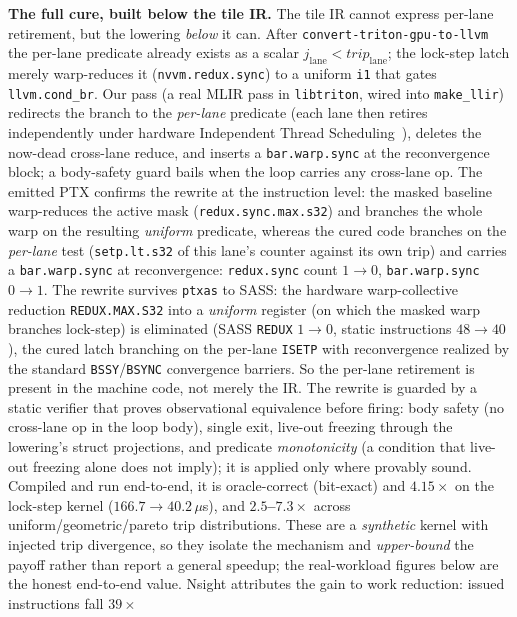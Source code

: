 \documentclass[acmsmall,review,anonymous]{acmart}
\begin{document}
\textbf{The full cure, built below the tile IR.} The tile IR cannot express per-lane retirement, but the
lowering \emph{below} it can. After \texttt{convert-triton-gpu-to-llvm} the per-lane predicate already
exists as a scalar $j_{\mathrm{lane}}<\mathit{trip}_{\mathrm{lane}}$; the lock-step latch merely
warp-reduces it (\texttt{nvvm.redux.sync}) to a uniform \texttt{i1} that gates \texttt{llvm.cond\_br}. Our
pass (a real MLIR pass in \texttt{libtriton}, wired into \texttt{make\_llir}) redirects the branch to the
\emph{per-lane} predicate (each lane then retires independently under hardware Independent Thread Scheduling~\cite{its2017}), deletes the now-dead cross-lane reduce, and inserts a \texttt{bar.warp.sync} at the
reconvergence block; a body-safety guard bails when the loop carries any cross-lane op. The emitted PTX confirms the rewrite at the instruction level: the masked baseline warp-reduces the active mask (\texttt{redux.sync.max.s32}) and branches the whole warp on the resulting \emph{uniform} predicate, whereas the cured code branches on the \emph{per-lane} test (\texttt{setp.lt.s32} of this lane's counter against its own trip) and carries a \texttt{bar.warp.sync} at reconvergence: \texttt{redux.sync} count $1\!\rightarrow\!0$, \texttt{bar.warp.sync} $0\!\rightarrow\!1$. The rewrite survives \texttt{ptxas} to SASS: the hardware warp-collective reduction \texttt{REDUX.MAX.S32} into a \emph{uniform} register (on which the masked warp branches lock-step) is eliminated (SASS \texttt{REDUX} $1\!\rightarrow\!0$, static instructions $48\!\rightarrow\!40$), the cured latch branching on the per-lane \texttt{ISETP} with reconvergence realized by the standard \texttt{BSSY}/\texttt{BSYNC} convergence barriers. So the per-lane retirement is present in the machine code, not merely the IR. The rewrite is guarded by a static verifier that proves observational equivalence before firing: body safety (no cross-lane op in the loop body), single exit, live-out freezing through the lowering's struct projections, and predicate \emph{monotonicity} (a condition that live-out freezing alone does not imply); it is applied only where provably sound. Compiled and run
end-to-end, it is oracle-correct (bit-exact) and \textbf{$4.15\times$} on the lock-step kernel
($166.7\rightarrow40.2\,\mu$s), and \textbf{$2.5$--$7.3\times$} across uniform/geometric/pareto trip
distributions. These are a \emph{synthetic} kernel with injected trip divergence, so they isolate the
mechanism and \emph{upper-bound} the payoff rather than report a general speedup; the real-workload
figures below are the honest end-to-end value. Nsight attributes the gain to work reduction: issued instructions fall \textbf{$39\times$}
\end{document}
